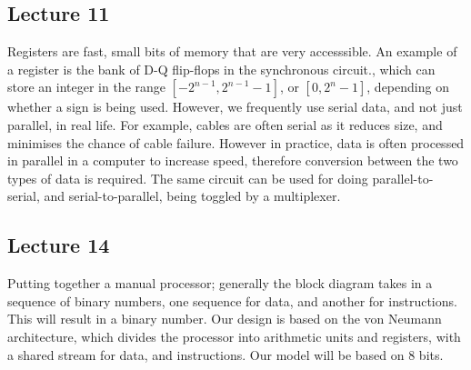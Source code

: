 \documentclass[a4paper, 12pt]{article}
\begin{document}
        \subsection*{Lecture 11}
            Registers are fast, small bits of memory that are very accesssible. An example of a register is the bank of D-Q flip-flops in the synchronous circuit., which can store an integer in the range $[-2^{n - 1}, 2^{n - 1} - 1]$, or $[0, 2^n - 1]$, depending on whether a sign is being used. However, we frequently use serial data, and not just parallel, in real life. For example, cables are often serial as it reduces size, and minimises the chance of cable failure. However in practice, data is often processed in parallel in a computer to increase speed, therefore conversion between the two types of data is required. The same circuit can be used for doing parallel-to-serial, and serial-to-parallel, being toggled by a multiplexer.
        \subsection*{Lecture 14}
            Putting together a manual processor; generally the block diagram takes in a sequence of binary numbers, one sequence for data, and another for instructions. This will result in a binary number. Our design is based on the von Neumann architecture, which divides the processor into arithmetic units and registers, with a shared stream for data, and instructions. Our model will be based on 8 bits.
            \medskip
\end{document}
